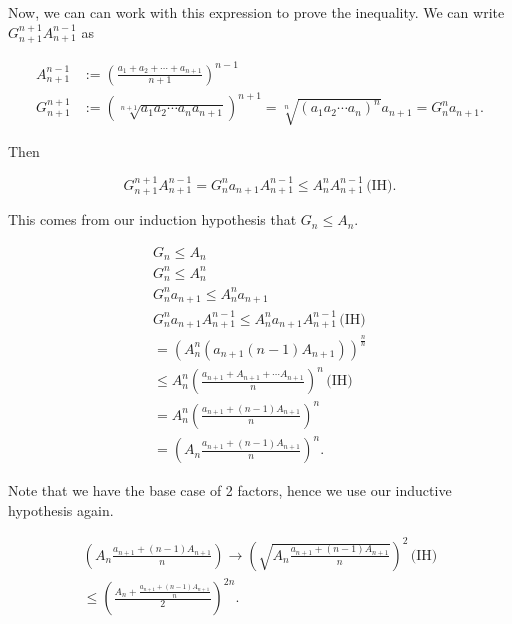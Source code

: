 Now, we can can work with this expression to prove the inequality. We can write \(G_{n + 1}^{n + 1} A_{n + 1}^{n - 1}\) as


\begin{align*}
	A_{n + 1}^{n - 1} & := \left(\frac{a_1 + a_2 + \cdots + a_{n + 1}}{n + 1}\right)^{n - 1}                                                                       \\
	G_{n + 1}^{n + 1} & := \left(\sqrt[n + 1]{a_1 a_2 \cdots a_n a_{n + 1}}\right)^{n + 1} = \sqrt[n]{{(a_1 a_2 \cdots a_n)}^{n}} a_{n + 1} = G_{n}^{n} a_{n + 1}.
\end{align*}

Then

\[
	G_{n + 1}^{n + 1}  A_{n + 1}^{n - 1} = G_{n}^{n} a_{n + 1} A_{n + 1}^{n - 1} \leq A_{n}^{n} A_{n + 1}^{n - 1}\, \text{(IH)}.
\]

This comes from our induction hypothesis that \(G_n \leq A_n\).

\begin{align*}
	G_n \leq A_n                                                                                          \\
	G_n^{n} \leq A_n^{n}                                                                                  \\
	G_n^{n} a_{n+1} \leq A_n^{n} a_{n+1}                                                                  \\
	G_{n}^{n} a_{n + 1} A_{n + 1}^{n - 1} \leq A_{n}^{n}a_{n + 1} A_{n + 1}^{n - 1} \, \text{(IH)}        \\
	= {\left(A_{n}^{n} \left( a_{n + 1}(n - 1)A_{n +1}\right) \right)}^{\frac{n}{n}}                      \\
	\leq A_{n}^{n} {\left( \frac{a_{n + 1} + A_{n + 1} + \cdots A_{n + 1}}{n} \right)}^{n} \, \text{(IH)} \\
	= A_{n}^{n} {\left( \frac{a_{n + 1} + (n - 1)A_{n + 1}}{n} \right)}^{n}                               \\
	= {\left( A_{n} \frac{a_{n + 1} + (n - 1)A_{n + 1}}{n} \right)}^{n}.
\end{align*}

Note that we have the base case of 2 factors, hence we use our inductive hypothesis again.

\begin{align*}
	\left( A_{n} \frac{a_{n + 1} + (n - 1)A_{n + 1}}{n} \right) \rightarrow  {\left( \sqrt{A_{n} \frac{a_{n + 1} + (n - 1)A_{n + 1}}{n}} \right)}^{2} \, \text{(IH)} \\
	\leq {\left( \frac{ A_n + \frac{a_{n + 1} + (n - 1)A_{n + 1}}{n}}{2} \right)}^{2n}.
\end{align*}

